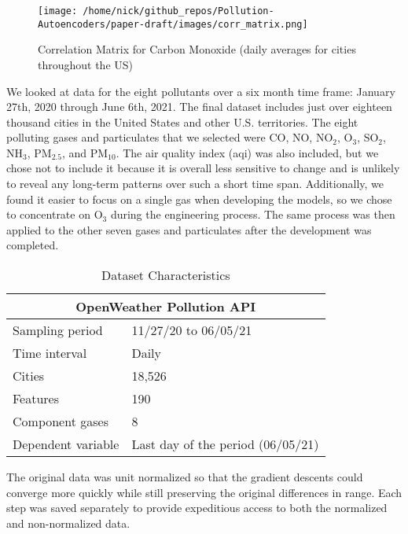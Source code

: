 \documentclass{article}
\begin{document}
\begin{figure}[h!]
\begin{center}
\texttt{[image: /home/nick/github\_repos/Pollution-Autoencoders/paper-draft/images/corr\_matrix.png]}
\end{center}
    \caption{Correlation Matrix for Carbon Monoxide (daily averages for cities throughout the US)}
\label{fig:matrix}
\end{figure}

\par We looked at data for the eight pollutants over a six month time frame: January 27th, 2020 through June 6th, 2021. The final dataset includes just over eighteen thousand cities in the United States and other U.S. territories. The eight polluting gases and particulates that we selected were CO, NO, NO$_2$, O$_3$, SO$_2$, NH$_3$, PM$_{2.5}$, and PM$_{10}$. The air quality index (aqi) was also included, but we chose not to include it because it is overall less sensitive to change and is unlikely to reveal any long-term patterns over such a short time span. Additionally, we found it easier to focus on a single gas when developing the models, so we chose to concentrate on O$_{3}$ during the engineering process. The same process was then applied to the other seven gases and particulates after the development was completed.

\begin{table}[h!]
\begin{center}
    \caption{Dataset Characteristics}
    \label{tab:table1}
    \vspace{0.1cm}
    \begin{tabular}{p{4cm}p{7cm}}
        \hline
        \multicolumn{2}{c}{OpenWeather Pollution API} \\
        \hline
        Sampling period  & 11/27/20 to 06/05/21\\
        Time interval & Daily  \\
        Cities & 18,526 \\
        Features & 190 \\
        Component gases & 8 \\
        Dependent variable & Last day of the period (06/05/21) \\
        \hline
    \end{tabular}
\end{center}
\end{table}

\par The original data was unit normalized so that the gradient descents could converge more quickly while still preserving the original differences in range. Each step was saved separately to provide expeditious access to both the normalized and non-normalized data.
\end{document}
